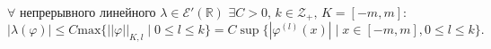 \begin{to_thr}
	$\forall$ непрерывного линейного $\lambda \in \mathcal{E}'(\mathbb{R})$ $\exists C>0, \, k \in \mathcal{Z}_+,\, K= [-m,m]:$
	\begin{equation*}
		|\lambda(\varphi)| \leq C \text{max} \{||\varphi||_{K,l} \mid 0\leq l \leq k\} = C \sup \{|\varphi^{(l)}(x)| \mid x \in [-m,m], 0 \leq l \leq k\}.
	\end{equation*}
\end{to_thr}